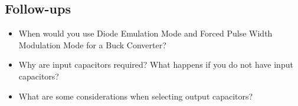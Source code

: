 \documentclass[main.tex]{subfiles}
\begin{document}
\subsection{Follow-ups}
\begin{itemize}
    \item When would you use Diode Emulation Mode and Forced Pulse Width Modulation Mode for a Buck Converter?  %
    \item Why are input capacitors required? What happens if you do not have input capacitors? %
    \item What are some considerations when selecting output capacitors? %
\end{itemize}
\end{document}
